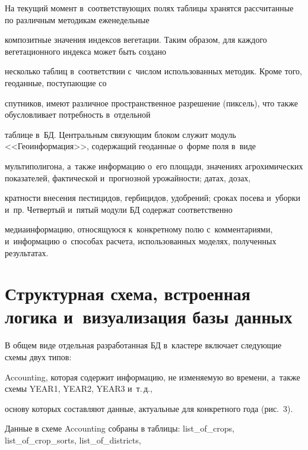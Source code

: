   На текущий момент в~соответствующих полях таблицы хранятся рассчитанные по различным методикам еженедельные

   композитные значения индексов вегетации. Таким образом, для каж\-до\-го вегетационного индекса может быть создано 

   несколько таб\-лиц в~соответствии с~чис\-лом использованных методик. Кроме того, геоданные, поступающие со 

   спутников, имеют различное пространственное разрешение (пиксель), что так\-же обуслов\-ли\-ва\-ет по\-треб\-ность в~отдельной 

   таблице в~БД. Центральным свя\-зу\-ющим блоком служит модуль <<Геоинформация>>, содержащий геоданные о~форме поля в~виде 

   мультиполигона, а~так\-же информацию о~его площади, значениях агрохимических показателей, фактической и~про\-гноз\-ной урожайности; датах, дозах, 

   кратности внесения пестицидов, гербицидов, удобрений; сроках посева и~уборки и~пр. Четвертый и~пятый модули БД содержат соответственно 

   медиаинформацию, от\-но\-ся\-щу\-юся к~конкретному полю с~комментариями, и~информацию о~способах расчета, использованных моделях, полученных результатах. 

   

   \vspace*{-5pt}

  

\section{Структурная схема, встроенная логика и~визуализация базы данных}



   \vspace*{-3pt}

   

  В общем виде отдельная разработанная БД в~клас\-те\-ре включает сле\-ду\-ющие схемы двух типов: 

  Accounting, которая содержит информацию, не из\-ме\-ня\-емую во времени, а~так\-же схемы YEAR1, YEAR2, YEAR3 и~т.\,д., 

  основу которых со\-став\-ля\-ют данные, актуальные для конкретного года (рис.~3).

  





  Данные в схеме Accounting собраны в таблицы: {list\_of\_crops}, list\_of\_crop\_\linebreak sorts, {list\_of\_districts}, 

